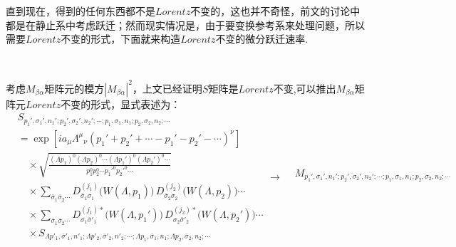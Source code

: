 直到现在，得到的任何东西都不是$Lorentz$不变的，这也并不奇怪，前文的讨论中都是在静止系中考虑跃迁；然而现实情况是，由于要变换参考系来处理问题，所以需要$Lorentz$不变的形式，下面就来构造$Lorentz$不变的微分跃迁速率.
\begin{center}
    \vspace{0.5cm}
        \text{\Large\color{red} ***}\\
    \vspace{0.5cm}
\end{center}
考虑$M_{\beta\alpha}$矩阵元的模方$|M_{\beta\alpha}|^2$，上文已经证明$S$矩阵是$Lorentz$不变,可以推出$M_{\beta\alpha}$矩阵元$Lorentz$不变的形式，显式表述为：
                                \begin{equation*}
                                    \begin{aligned}
                                        &S_{p_1',\sigma_1',n_1';p_2',\sigma_2',n_2';\cdots;p_1,\sigma_1,n_1;p_2,\sigma_2,n_2;\cdots} \\
                                        &= \exp\!\left[ i a_\mu \Lambda^\mu{}_\nu \left( p_1' + p_2' + \cdots - p_1' - p_2' - \cdots \right)^\nu \right] \\
                                        &\quad\times \sqrt{ \frac{ (\Lambda p_1)^0 (\Lambda p_2)^0 \cdots (\Lambda p_1')^0 (\Lambda p_2')^0 \cdots }{ p_1^0 p_2^0 \cdots p_1'^0 p_2'^0 \cdots } } \\
                                        &\quad\times \sum_{\bar{\sigma}_1 \bar{\sigma}_2 \cdots} D^{(j_1)}_{\bar{\sigma}_1 \sigma_1} \bigl( W(\Lambda, p_1) \bigr) \, D^{(j_2)}_{\bar{\sigma}_2 \sigma_2} \bigl( W(\Lambda, p_2) \bigr) \cdots \\
                                        &\quad\times \sum_{\bar{\sigma}_1 \bar{\sigma}_2 \cdots} D^{(j_1)*}_{\sigma_1 \bar{\sigma}'_1} \bigl( W(\Lambda, p_1') \bigr) \, D^{(j_2)*}_{\sigma_2 \bar{\sigma}'_2} \bigl( W(\Lambda, p_2') \bigr) \cdots \\
                                        &\quad\times S_{\Lambda p'_1,\bar{\sigma}'_1,n'_1;\Lambda p'_2,\bar{\sigma}'_2,n'_2;\cdots;\Lambda p_1,\bar{\sigma}_1,n_1;\Lambda p_2,\bar{\sigma}_2,n_2;\cdots} 
                                    \end{aligned}
                                    \longrightarrow
                                    \begin{aligned}
                                        &M_{p_1',\sigma_1',n_1';p_2',\sigma_2',n_2';\cdots;p_1,\sigma_1,n_1;p_2,\sigma_2,n_2;\cdots} \\

\end{aligned}
\end{equation*}
